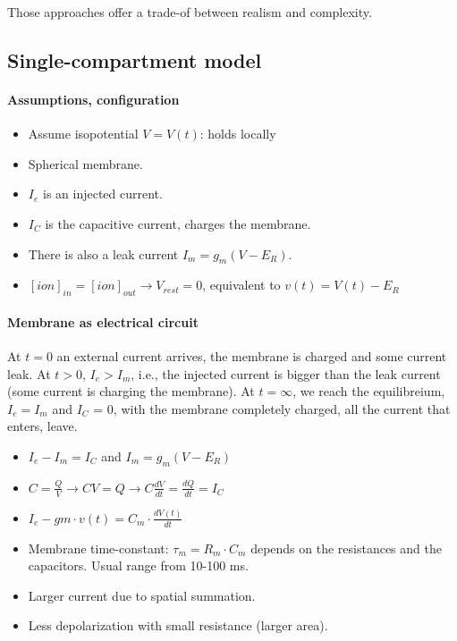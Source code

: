 \documentclass[main]{subfiles}
\begin{document}
Those approaches offer a trade-of between realism and complexity.

\subsection{Single-compartment model}

\paragraph{Assumptions, configuration}
\begin{itemize}[noitemsep,nolistsep]
	\item Assume isopotential $V = V(t)$: holds locally
	\item Spherical membrane.
	\item $I_e$ is an injected current.
	\item $I_C$ is the capacitive current, charges the membrane.
	\item There is also a leak current $I_m = g_m(V-E_R)$.
	\item $[ion]_{in} = [ion]_{out} \rightarrow V_{rest} = 0$, equivalent to $v(t) = V(t) - E_R$
\end{itemize}

\paragraph{Membrane as electrical circuit}

At $t = 0$ an external current arrives, the membrane is charged and some current leak. At $t > 0$, $I_e > I_m$, i.e., the injected current is bigger than the leak current (some current is charging the membrane). At $t = \infty$,  we reach the equilibreium, $I_e = I_m$ and $I_C$ = 0, with the membrane completely charged, all the current that enters, leave.

\begin{itemize}[noitemsep,nolistsep]
	\item $I_e  - I_m = I_C$ and $I_m=g_m(V-E_R)$
	\item $C = \frac{Q}{V} \rightarrow CV = Q \rightarrow C\frac{dV}{dt} = \frac{dQ}{dt} = I_C$
	\item $I_e - gm \cdot v(t) = C_m \cdot \frac{dV(t)}{dt}$
	\item Membrane time-constant: $\tau_m = R_m \cdot C_m$
	\subitem depends on the resistances and the capacitors. Usual range from 10-100 ms.
	\item Larger current due to spatial summation.
	\item Less depolarization with small resistance (larger area).
\end{itemize}
\end{document}
